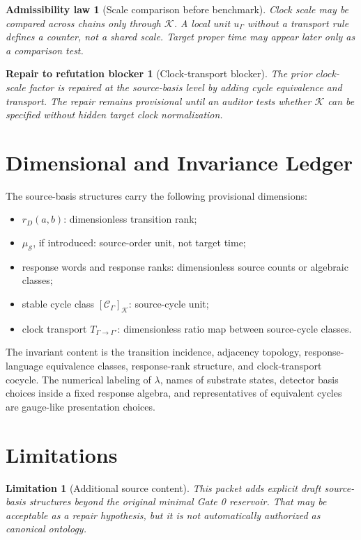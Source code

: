 \documentclass[11pt]{article}
\newcommand{\Cycle}{\mathcal{C}_{\Gamma}}
\newtheorem{admissibility}{Admissibility law}
\newtheorem{repair}{Repair to refutation blocker}
\newtheorem{limitation}{Limitation}
\begin{document}
\begin{admissibility}[Scale comparison before benchmark]
Clock scale may be compared across chains only through \(\mathcal{K}\). A
local unit \(u_{\Gamma}\) without a transport rule defines a counter, not a
shared scale. Target proper time may appear later only as a comparison test.
\end{admissibility}

\begin{repair}[Clock-transport blocker]
The prior clock-scale factor is repaired at the source-basis level by adding
cycle equivalence and transport. The repair remains provisional until an
auditor tests whether \(\mathcal{K}\) can be specified without hidden target
clock normalization.
\end{repair}

\section{Dimensional and Invariance Ledger}

The source-basis structures carry the following provisional dimensions:
\begin{itemize}
    \item \(r_D(a,b)\): dimensionless transition rank;
    \item \(\mu_{\mathcal{S}}\), if introduced: source-order unit, not target
    time;
    \item response words and response ranks: dimensionless source counts or
    algebraic classes;
    \item stable cycle class \([\Cycle]_{\mathcal{K}}\): source-cycle unit;
    \item clock transport \(T_{\Gamma\to\Gamma'}\): dimensionless ratio map
    between source-cycle classes.
\end{itemize}

The invariant content is the transition incidence, adjacency topology,
response-language equivalence classes, response-rank structure, and
clock-transport cocycle. The numerical labeling of \(\lambda\), names of
substrate states, detector basis choices inside a fixed response algebra, and
representatives of equivalent cycles are gauge-like presentation choices.

\section{Limitations}

\begin{limitation}[Additional source content]
This packet adds explicit draft source-basis structures beyond the original
minimal Gate 0 reservoir. That may be acceptable as a repair hypothesis, but
it is not automatically authorized as canonical ontology.
\end{limitation}
\end{document}
